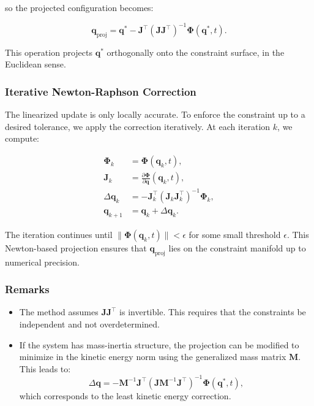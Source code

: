 \documentclass{article}
\begin{document}
so the projected configuration becomes:

\begin{equation}
    \bm{q}_{\text{proj}} = \bm{q}^* - \bm{J}^\top(\bm{J} \bm{J}^\top)^{-1} \bm{\Phi}(\bm{q}^*, t).
\end{equation}

This operation projects \( \bm{q}^* \) orthogonally onto the constraint surface,
in the Euclidean sense.

\subsubsection*{Iterative Newton-Raphson Correction}

The linearized update is only locally accurate. To enforce the constraint up to
a desired tolerance, we apply the correction iteratively. At each iteration \( k
\), we compute:

\begin{align}
    \bm{\Phi}_k &= \bm{\Phi}(\bm{q}_k, t), \\
    \bm{J}_k &= \frac{\partial \bm{\Phi}}{\partial \bm{q}} (\bm{q}_k, t), \\
    \Delta \bm{q}_k &= -\bm{J}_k^\top (\bm{J}_k \bm{J}_k^\top)^{-1} \bm{\Phi}_k, \\
    \bm{q}_{k+1} &= \bm{q}_k + \Delta \bm{q}_k.
\end{align}

The iteration continues until \( \| \bm{\Phi}(\bm{q}_k, t) \| < \epsilon \) for
some small threshold \( \epsilon \). This Newton-based projection ensures that
\( \bm{q}_{\text{proj}} \) lies on the constraint manifold up to numerical
precision.

\subsubsection*{Remarks}

\begin{itemize}
    \item The method assumes \( \bm{J} \bm{J}^\top \) is invertible. This
    requires that the constraints be independent and not overdetermined.
    \item If the system has mass-inertia structure, the projection can be
    modified to minimize in the kinetic energy norm using the generalized mass
    matrix \( \bm{M} \). This leads to:
    \[
        \Delta \bm{q} = -\bm{M}^{-1} \bm{J}^\top (\bm{J} \bm{M}^{-1} \bm{J}^\top)^{-1} \bm{\Phi}(\bm{q}^*, t),
    \]
    which corresponds to the least kinetic energy correction.
\end{itemize}
\end{document}
